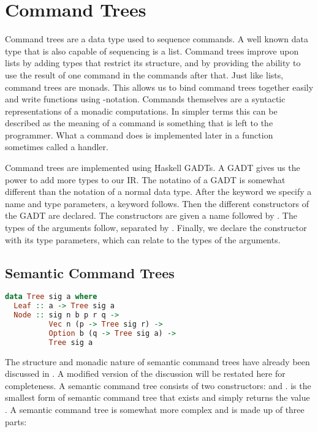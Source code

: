 \section{\label{section:commandtree}Command Trees}
Command trees are a data type used to sequence commands. A well known data type that is also capable of sequencing is a list. Command trees improve upon lists by adding types that restrict its structure, and by providing the ability to use the result of one command in the commands after that. Just like lists, command trees are monads. This allows us to bind command trees together easily and write functions using -notation. Commands themselves are a syntactic representations of a monadic computations. In simpler terms this can be described as the meaning of a command is something that is left to the programmer. What a command does is implemented later in a function sometimes called a handler.

Command trees are implemented using Haskell \acp{GADT}. A \ac{GADT} gives us the power to add more types to our \ac{IR}. The notatino of a \ac{GADT} is somewhat different than the notation of a normal data type. After the  keyword we specify a name and type parameters, a  keyword follows. Then the different constructors of the \ac{GADT} are declared. The constructors are given a name followed by \icode{::}. The types of the arguments follow, separated by \icode{->}. Finally, we declare the constructor with its type parameters, which can relate to the types of the arguments.

\subsection{\label{subsection:semantree}Semantic Command Trees}
\begin{lstlisting}[language=Haskell]
data Tree sig a where
  Leaf :: a -> Tree sig a
  Node :: sig n b p r q ->
          Vec n (p -> Tree sig r) ->
          Option b (q -> Tree sig a) ->
          Tree sig a
\end{lstlisting}

The structure and monadic nature of semantic command trees have already been discussed in . A modified version of the discussion will be restated here for completeness. A semantic command tree consists of two constructors:  and .  is the smallest form of semantic command tree that exists and simply returns the value . A  semantic command tree is somewhat more complex and is made up of three parts:

